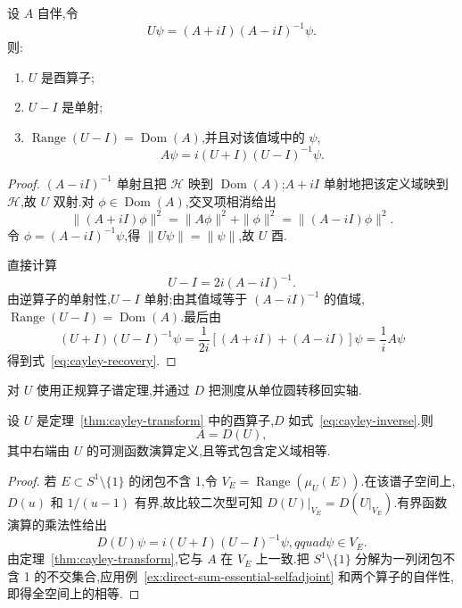 \begin{theorem}[Cayley 变换]\label{thm:cayley-transform}
设 \(A\) 自伴,令
\[
U\psi=(A+iI)(A-iI)^{-1}\psi.
\]
则:
\begin{enumerate}
\item \(U\) 是酉算子;
\item \(U-I\) 是单射;
\item \(\operatorname{Range}(U-I)=\operatorname{Dom}(A)\),并且对该值域中的 \(\psi\),
\[
A\psi=i(U+I)(U-I)^{-1}\psi.
\label{eq:cayley-recovery}
\]
\end{enumerate}
\end{theorem}

\begin{proof}
\((A-iI)^{-1}\) 单射且把 \(\mathcal{H}\) 映到 \(\operatorname{Dom}(A)\);\(A+iI\) 单射地把该定义域映到 \(\mathcal{H}\),故 \(U\) 双射.对 \(\phi\in\operatorname{Dom}(A)\),交叉项相消给出
\[
\|(A+iI)\phi\|^{2}=\|A\phi\|^{2}+\|\phi\|^{2}=\|(A-iI)\phi\|^{2}.
\]
令 \(\phi=(A-iI)^{-1}\psi\),得 \(\|U\psi\|=\|\psi\|\),故 \(U\) 酉.

直接计算
\[
U-I=2i(A-iI)^{-1}.
\label{eq:cayley-difference}
\]
由逆算子的单射性,\(U-I\) 单射;由其值域等于 \((A-iI)^{-1}\) 的值域,\(\operatorname{Range}(U-I)=\operatorname{Dom}(A)\).最后由
\[
(U+I)(U-I)^{-1}\psi=\frac{1}{2i}[(A+iI)+(A-iI)]\psi
=\frac{1}{i}A\psi
\]
得到式~\eqref{eq:cayley-recovery}.
\end{proof}

对 \(U\) 使用正规算子谱定理,并通过 \(D\) 把测度从单位圆转移回实轴.

\begin{proposition}\label{prop:cayley-functional-calculus}
设 \(U\) 是定理~\ref{thm:cayley-transform} 中的酉算子,\(D\) 如式~\eqref{eq:cayley-inverse}.则
\[
A=D(U),
\label{eq:cayley-functional-calculus}
\]
其中右端由 \(U\) 的可测函数演算定义,且等式包含定义域相等.
\end{proposition}

\begin{proof}
若 \(E\subset S^{1}\setminus\{1\}\) 的闭包不含 1,令 \(V_{E}=\operatorname{Range}(\mu_{U}(E))\).在该谱子空间上,\(D(u)\) 和 \(1/(u-1)\) 有界,故比较二次型可知 \(D(U)|_{V_{E}}=D(U|_{V_{E}})\).有界函数演算的乘法性给出
\[
D(U)\psi=i(U+I)(U-I)^{-1}\psi,qquad\psi\in V_{E}.
\]
由定理~\ref{thm:cayley-transform},它与 \(A\) 在 \(V_{E}\) 上一致.把 \(S^{1}\setminus\{1\}\) 分解为一列闭包不含 1 的不交集合,应用例~\ref{ex:direct-sum-essential-selfadjoint} 和两个算子的自伴性,即得全空间上的相等.
\end{proof}

